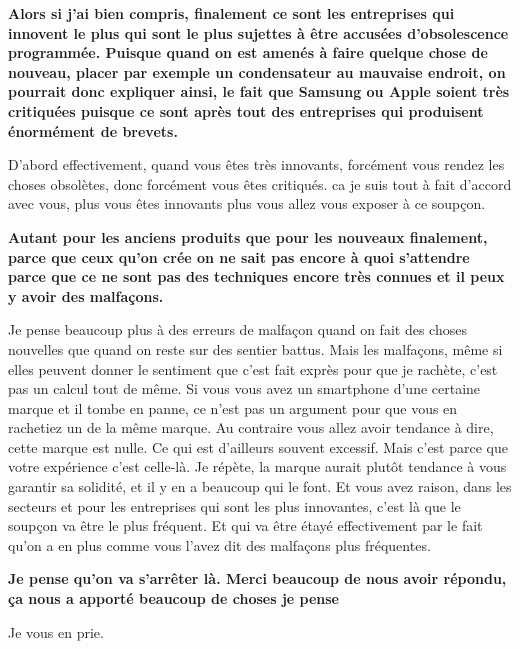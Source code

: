 \begin{small}
\textbf{Alors si j'ai bien compris, finalement ce sont les entreprises qui innovent le plus qui sont le plus sujettes à être accusées d'obsolescence programmée. Puisque quand on est amenés à faire quelque chose de nouveau, placer par exemple un condensateur au mauvaise endroit, on pourrait donc expliquer ainsi, le fait que Samsung ou Apple soient très critiquées puisque ce sont après tout des entreprises qui produisent énormément de brevets. }
\smallbreak


D'abord effectivement, quand vous êtes très innovants, forcément vous rendez les choses obsolètes, donc forcément vous êtes critiqués. ca je suis tout à fait d'accord avec vous, plus vous êtes innovants plus vous allez vous exposer à ce soupçon. 

\textbf{Autant pour les anciens produits que pour les nouveaux finalement, parce que ceux qu'on crée on ne sait pas encore à quoi s'attendre parce que ce ne sont pas des  techniques  encore très connues et il peux y avoir des malfaçons.}
\smallbreak


Je pense beaucoup plus à des erreurs de malfaçon quand on fait des choses nouvelles que quand on reste sur des sentier battus. Mais les malfaçons, même si elles peuvent donner le sentiment que c'est fait exprès pour que je rachète, c'est pas un calcul tout de même. Si vous vous avez un smartphone d'une certaine marque et il tombe en panne, ce n'est pas un argument pour que vous en rachetiez un de la même marque. Au contraire vous allez avoir tendance à dire, cette marque est nulle. Ce qui est d'ailleurs souvent excessif. Mais c'est parce que votre expérience c'est celle-là. Je répète, la marque aurait plutôt tendance à vous garantir sa solidité, et il y en a beaucoup qui le font. Et vous avez raison, dans les secteurs et pour les entreprises qui sont les plus innovantes, c'est là que le soupçon va être le plus fréquent. Et qui va être étayé effectivement par le fait qu'on a en plus comme vous l'avez dit des malfaçons plus fréquentes. 

\textbf{Je pense qu'on va s'arrêter là. Merci beaucoup de nous avoir répondu, ça nous a apporté beaucoup de choses je pense}
\smallbreak


Je vous en prie.

\end{small}
